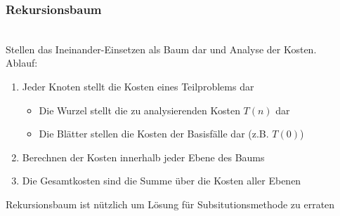 \documentclass[
    ngerman,
    color=3b,
    dark_mode,
    load_common, %
    summary,
    boxarc,
]{rubos-tuda-template}
\begin{document}
\subsubsection{Rekursionsbaum}\mbox{}
\begin{idea}[Rekursionsbaum]\mbox{}\\
    Stellen das Ineinander-Einsetzen als Baum dar und Analyse der Kosten.\\
    Ablauf:
    \begin{enumerate}
        \item Jeder Knoten stellt die Kosten eines Teilproblems dar
              \begin{itemize}
                  \item Die Wurzel stellt die zu analysierenden Kosten $T(n)$ dar
                  \item Die Blätter stellen die Kosten der Basisfälle dar (z.B. $T(0)$)
              \end{itemize}
        \item Berechnen der Kosten innerhalb jeder Ebene des Baums
        \item Die Gesamtkosten sind die Summe über die Kosten aller Ebenen
    \end{enumerate}
\end{idea}
Rekursionsbaum ist nützlich um Lösung für Subsitutionsmethode zu erraten
\clearpage
\end{document}

